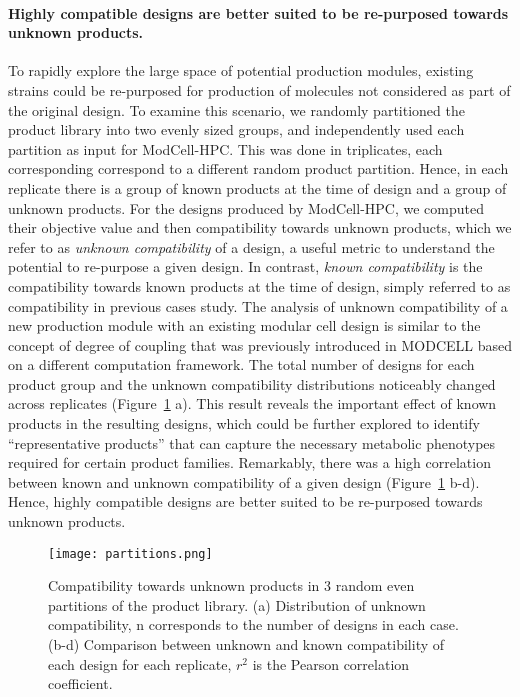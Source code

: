 {\paragraph{Highly compatible designs are better suited to be re-purposed towards unknown products.}
To rapidly explore the large space of potential production modules, existing strains could be re-purposed for production of molecules not considered as part of the original design.
To examine this scenario,  we randomly partitioned the product library into two evenly sized groups, and independently used each partition as input for ModCell-HPC.
This was done in triplicates, each corresponding correspond to a different random product partition.
Hence, in each replicate there is a group of known products at the time of design and a group of unknown products.
For the designs produced by ModCell-HPC, we computed their objective value and then compatibility towards unknown products, which we refer to as \emph{unknown compatibility} of a design, a useful metric to understand the potential to re-purpose a given design.
In contrast, \emph{known compatibility} is the compatibility towards known products at the time of design, simply referred to as compatibility in previous cases study.
The analysis of unknown compatibility of a new production module with an existing modular cell design is similar to the concept of degree of coupling that was previously introduced in MODCELL based on a different computation framework.\citep{trinh2015}
The total number of designs for each product group and the unknown compatibility distributions noticeably changed across replicates (Figure~\ref{fig7:partitions} a).
This result reveals the important effect of known products in the resulting designs, which could be further explored to identify ``representative products'' that can capture the necessary metabolic phenotypes required for certain product families.
Remarkably, there was a high correlation between known and unknown compatibility
of a given design (Figure~\ref{fig7:partitions} b-d).
Hence, highly compatible designs are better suited to be re-purposed towards unknown products.

\begin{figure}[h]
    \centering
    \texttt{[image: partitions.png]}
    \caption[Compatibility towards unknown products in 3 random even partitions]{Compatibility towards unknown products in 3 random even partitions of the product library. (a) Distribution of unknown compatibility, n corresponds to the number of designs in each case. (b-d) Comparison between unknown and known compatibility of each design for each replicate, $r^2$ is the Pearson correlation coefficient.}
    \label{fig7:partitions}
\end{figure}

}
